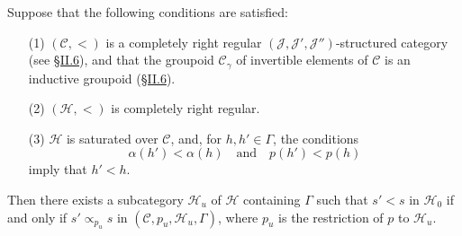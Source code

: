 \documentclass[a4paper,fleqn]{article}
\theoremstyle{plain}
\newenvironment{theorem}[1]
  {\renewcommand\theinnertheorem{#1}\innertheorem}
  {\endinnertheorem}
\theoremstyle{definition}
\newcommand{\oldpage}[1]{{\marginpar{\footnotesize$\bigg\vert$\,\,\,\,\textit{p.~#1}}}}
\newcommand{\textand}{\quad\text{and}\quad}
\newcommand{\CC}{\mathcal{C}}
\newcommand{\HH}{\mathcal{H}}
\newcommand{\subs}{\mathrel{\propto}}
\newcommand{\JJ}{\mathcal{J}}
\begin{document}
\begin{theorem}{4}
\label{theorem:i-4}
  Suppose that the following conditions are satisfied:
  \begin{enumerate}
    \item[\normalfont(1)]
      $(\CC,<)$ is a completely right regular $(\JJ,\JJ',\JJ'')$-structured category (see \hyperref[section:ii.6]{§II.6}), and that the groupoid $\CC_\gamma$ of invertible elements of $\CC$ is an inductive groupoid (\hyperref[section:ii.6]{§II.6}).

    \item[\normalfont(2)]
      $(\HH,<)$ is completely right regular.

    \item[\normalfont(3)]
      $\HH$ is saturated over $\CC$, and, for $h,h'\in\Gamma$, the conditions
      \[
        \alpha(h')<\alpha(h)
        \textand
        p(h')<p(h)
      \]
      imply that $h'<h$.
  \end{enumerate}

  \oldpage{377}
  Then there exists a subcategory $\HH_u$ of $\HH$ containing $\Gamma$ such that $s'<s$ in $\HH_0$ if and only if $s'\subs_{p_u}s$ in $(\CC,p_u,\HH_u,\Gamma)$, where $p_u$ is the restriction of $p$ to $\HH_u$.
\end{theorem}
\end{document}
